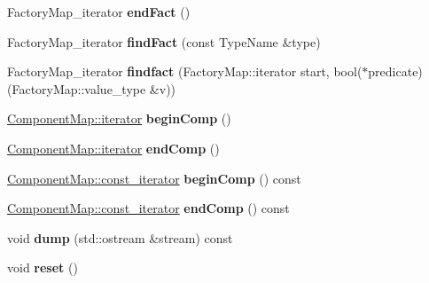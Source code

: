 \begin{DoxyCompactItemize}
Factory\+Map\+\_\+iterator {\bfseries end\+Fact} ()
\item 
\mbox{\label{classtheoria_1_1core_1_1Registry_a54ee3016a6f14b3bedfecd3566caf0b5}} 
Factory\+Map\+\_\+iterator {\bfseries find\+Fact} (const Type\+Name \&type)
\item 
\mbox{\label{classtheoria_1_1core_1_1Registry_a044928d257bed09b8c288c41e5c95a26}} 
Factory\+Map\+\_\+iterator {\bfseries findfact} (Factory\+Map\+::iterator start, bool($\ast$predicate)(Factory\+Map\+::value\+\_\+type \&v))
\item 
\mbox{\label{classtheoria_1_1core_1_1Registry_a18f0cf6b2c11daeac894231aabc2d6c3}} 
\hyperlink{classtheoria_1_1util_1_1densemap_1_1Iter}{Component\+Map\+::iterator} {\bfseries begin\+Comp} ()
\item 
\mbox{\label{classtheoria_1_1core_1_1Registry_a66ed200d29e49b9eb762a29f580c102a}} 
\hyperlink{classtheoria_1_1util_1_1densemap_1_1Iter}{Component\+Map\+::iterator} {\bfseries end\+Comp} ()
\item 
\mbox{\label{classtheoria_1_1core_1_1Registry_a82497b1f2b7bf529b15633dfaf9bd1e6}} 
\hyperlink{classtheoria_1_1util_1_1densemap_1_1ConstIter}{Component\+Map\+::const\+\_\+iterator} {\bfseries begin\+Comp} () const
\item 
\mbox{\label{classtheoria_1_1core_1_1Registry_a27b24a7a567677cb23aef0d3510b0a20}} 
\hyperlink{classtheoria_1_1util_1_1densemap_1_1ConstIter}{Component\+Map\+::const\+\_\+iterator} {\bfseries end\+Comp} () const
\item 
\mbox{\label{classtheoria_1_1core_1_1Registry_a1c4d191d20916e4821bee32680a804e6}} 
void {\bfseries dump} (std\+::ostream \&stream) const
\item 
\mbox{\label{classtheoria_1_1core_1_1Registry_af66ab76f6173d7e7c99a0c47dc2bfd70}} 
void {\bfseries reset} ()
\item 
\mbox{\label{classtheoria_1_1core_1_1Registry_a33f5edc42d5a194a7682bf0bf20cbf52}} 

\end{DoxyCompactItemize}
